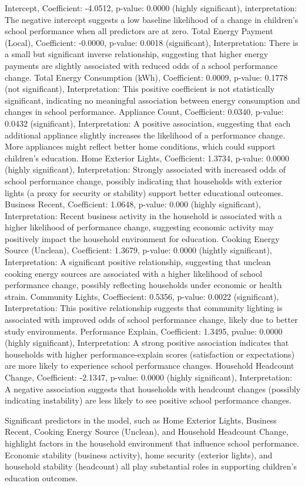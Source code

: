\documentclass[journal=jacsat,manuscript=article]{achemso}
\begin{document}
Intercept, Coefficient: -4.0512, p-value: 0.0000 (highly significant), interpretation: The negative intercept suggests a low baseline likelihood of a change in children's school performance when all predictors are at zero. Total Energy Payment (Local), Coefficient: -0.0000, p-value: 0.0018 (significant), Interpretation: There is a small but significant inverse relationship, suggesting that higher energy payments are slightly associated with reduced odds of a school performance change. Total 
Energy Consumption (kWh), Coefficient: 0.0009, p-value: 0.1778 (not significant), Interpretation: This positive coefficient is not statistically significant, indicating no meaningful association between energy consumption and changes in school performance. Appliance Count, Coefficient: 0.0340, p-value: 0.0432 (significant), Interpretation: A positive association, suggesting that each additional appliance slightly increases the likelihood of a performance change. More appliances might reflect better home conditions, which could support children's education. Home Exterior Lights, Coefficient: 1.3734, p-value: 0.0000 (highly significant), Interpretation: Strongly associated with increased odds of school performance change, possibly indicating that households with exterior lights (a proxy for security or stability) support better educational outcomes. Business Recent, Coefficient: 1.0648, p-value: 0.000 (highly significant), Interpretation: Recent business activity in the household is associated with a higher likelihood of performance change, suggesting economic activity may positively impact the household environment for education. Cooking Energy Source (Unclean), Coefficient: 1.3679, p-value: 0.0000 (hightly significant), Interpretation: A significant positive relationship, suggesting that unclean cooking energy sources are associated with a higher likelihood of school performance change, possibly reflecting households under economic or health strain. Community Lights, Coeffiecient: 0.5356, p-value: 0.0022 (significant), Interpretation: This positive relationship suggests that community lighting is associated with improved odds of school performance change, likely due to better study environments. Performance Explain, Coefficient: 1.3495, pvalue: 0.0000 (highly significant), Interpretation: A strong positive association indicates that households with higher performance-explain scores (satisfaction or expectations) are more likely to experience school performance changes. Household Headcount Change, Coefficient: -2.1347, p-value: 0.0000 (highly significant), Interpretation: A negative association suggests that households with headcount changes (possibly indicating instability) are less likely to see positive school performance changes.

Significant predictors in the model, such as Home Exterior Lights, Business Recent, Cooking Energy Source (Unclean), and Household Headcount Change, highlight factors in the household environment that influence school performance. Economic stability (business activity), home security (exterior lights), and household stability (headcount) all play substantial roles in supporting children's education outcomes.


\end{document}

